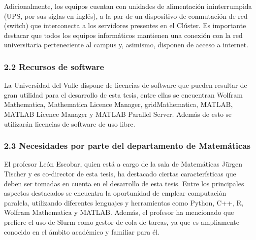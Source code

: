 \begin{spacing}{1.5}
    Adicionalmente, los equipos cuentan con unidades de alimentación ininterrumpida (UPS, por sus siglas en inglés), a la par de un dispositivo de conmutación de red (switch) que interconecta a los servidores presentes en el Clúster. Es importante destacar que todos los equipos informáticos mantienen una conexión con la red universitaria perteneciente al campus y, asimismo, disponen de acceso a internet.

    \subsubsection{2.2 Recursos de software}

    La Universidad del Valle dispone de licencias de software que pueden resultar de gran utilidad para el desarrollo de esta tesis, entre ellas se encuentran Wolfram Mathematica, Mathematica Licence Manager, gridMathematica, MATLAB, MATLAB Licence Manager y MATLAB Parallel Server. Además de esto se utilizarán licencias de software de uso libre.

    \subsubsection{2.3 Necesidades por parte del departamento de Matemáticas}

    El profesor León Escobar, quien está a cargo de la sala de Matemáticas Jürgen Tischer y es co-director de esta tesis, ha destacado ciertas características que deben ser tomadas en cuenta en el desarrollo de esta tesis. Entre los principales aspectos destacados se encuentra la oportunidad de emplear computación paralela, utilizando diferentes lenguajes y herramientas como Python, C++, R, Wolfram Mathematica y MATLAB.
    Además, el profesor ha mencionado que prefiere el uso de Slurm como gestor de cola de tareas, ya que es ampliamente conocido en el ámbito académico y familiar para él.

  
    \mylinespacing
    \mylinespacing
    \begin{tightcenter}
    \end{tightcenter}
  \end{spacing}
  
